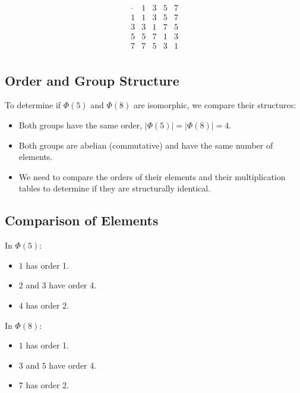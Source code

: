 \documentclass[12pt]{amsart}
\theoremstyle{definition}
\numberwithin{equation}{section}
\begin{document}
\begin{exercise}{1}
    \[
    \begin{array}{c|cccc}
      \cdot & 1 & 3 & 5 & 7 \\
      \hline
      1 & 1 & 3 & 5 & 7 \\
      3 & 3 & 1 & 7 & 5 \\
      5 & 5 & 7 & 1 & 3 \\
      7 & 7 & 5 & 3 & 1 \\
    \end{array}
    \]
    
    \subsection*{Order and Group Structure}
    
    To determine if \(\Phi(5)\) and \(\Phi(8)\) are isomorphic, we compare their structures:
    
    \begin{itemize}[label=--]
        \item Both groups have the same order, \(|\Phi(5)| = |\Phi(8)| = 4\).
        \item Both groups are abelian (commutative) and have the same number of elements.
        \item We need to compare the orders of their elements and their multiplication tables to determine if they are structurally identical.
    \end{itemize}
    
    \subsection*{Comparison of Elements}
    
    In \(\Phi(5)\):
    \begin{itemize}[label=--]
        \item \(1\) has order 1.
        \item \(2\) and \(3\) have order 4.
        \item \(4\) has order 2.
    \end{itemize}
    
    In \(\Phi(8)\):
    \begin{itemize}[label=--]
        \item \(1\) has order 1.
        \item \(3\) and \(5\) have order 4.
        \item \(7\) has order 2.
    \end{itemize}
    

\end{exercise}
\end{document}

